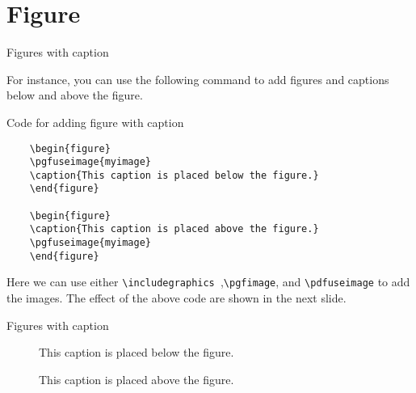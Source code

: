 \documentclass[10pt,xcolor=x11names]{beamer}
\begin{document}
\section{Figure}
\begin{frame}[fragile]{Figures with caption}

 For instance, you can use the following command to add figures and captions below and above the figure.

{\footnotesize 
\begin{exampleblock}{Code for adding figure with caption}
	\begin{verbatim}
	\begin{figure}
	\pgfuseimage{myimage}
	\caption{This caption is placed below the figure.}
	\end{figure}
	
	\begin{figure}
	\caption{This caption is placed above the figure.}
	\pgfuseimage{myimage}
	\end{figure}
	\end{verbatim}
\end{exampleblock}
}

Here we can use either \verb|\includegraphics |,\verb|\pgfimage|, and \verb|\pdfuseimage| to add the images. The effect of the above code are shown in the next slide.  
\end{frame}

\begin{frame}[fragile]{Figures with caption} \vspace{-6pt}

\begin{figure}
	\caption{This caption is placed below the figure.}
\end{figure}
\begin{figure}
	\caption{This caption is placed above the figure.}
\end{figure}

\end{frame}
\end{document}
